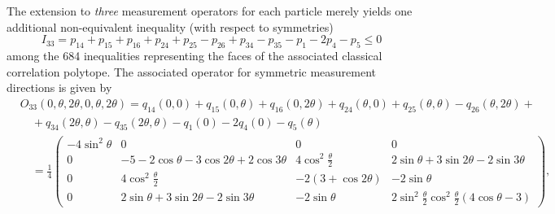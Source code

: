 \documentclass[pra,amsmath,amsfonts,showkeys,showpacs,preprint]{revtex4}
\begin{document}
The extension to \emph{three} measurement operators for each particle merely
yields one additional non-equivalent inequality (with respect to
symmetries) \cite{collins-gisin03,sliwa03}
\begin{equation}
I_{33}=p_{14} + p_{15} + p_{16} + p_{24} + p_{25} - p_{26} + p_{34} - p_{35}
- p_{1} - 2 p_{4} - p_{5} \leq 0
\end{equation}
 among the 684 inequalities \cite{pitowsky01} representing the
 faces of the associated classical correlation polytope.
The associated operator for symmetric
measurement directions is given by
\begin{equation}
\begin{array}{lll}
&O_{33}(0,\theta,2\theta,0,\theta,2\theta)= q_{14}(0,0) + q_{15}(0,\theta) + q_{16}(0,2\theta) + q_{24}(\theta,0) +
q_{25}(\theta,\theta) - q_{26}(\theta,2\theta) +\\
&\quad  + q_{34}(2\theta,\theta)- q_{35}(2\theta,\theta)-q_{1}(0) - 2 q_{4}(0) - q_{5}(\theta) \\
&\quad =\frac{1}{4}\left(
\begin{array}{cccc}
-4\sin^2\theta & 0 & 0 & 0\\
0 & -5-2\cos\theta - 3\cos 2\theta + 2\cos 3\theta &
4\cos^2\frac{\theta}{2} & 2\sin\theta + 3 \sin 2\theta - 2 \sin
3\theta\\
0 & 4\cos^2\frac{\theta}{2} & -2(3+\cos 2\theta) & - 2\sin\theta \\
0 &  2\sin\theta + 3 \sin 2\theta - 2 \sin 3\theta & - 2\sin\theta &
2\sin^2\frac{\theta}{2}\cos^2\frac{\theta}{2}(4\cos\theta -3)
\end{array}\right),
\end{array}
\label{2004-qbounds-e5}
\end{equation}
\end{document}
